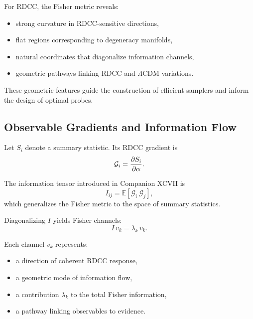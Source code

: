 \documentclass[11pt,a4paper]{article}
\begin{document}
For RDCC, the Fisher metric reveals:

\begin{itemize}
    \item strong curvature in RDCC-sensitive directions,
    \item flat regions corresponding to degeneracy manifolds,
    \item natural coordinates that diagonalize information channels,
    \item geometric pathways linking RDCC and $\Lambda$CDM variations.
\end{itemize}

These geometric features guide the construction of efficient samplers and inform
the design of optimal probes.

\subsection{Observable Gradients and Information Flow}

Let $S_{i}$ denote a summary statistic. Its RDCC gradient is
\begin{equation}
    \mathcal{G}_{i}
    =
    \pdv{S_{i}}{\alpha}.
\end{equation}

The information tensor introduced in Companion XCVII is
\begin{equation}
    I_{ij}
    =
    \mathbb{E}\!\left[
        \mathcal{G}_{i}\,
        \mathcal{G}_{j}
    \right],
\end{equation}
which generalizes the Fisher metric to the space of summary statistics.

Diagonalizing $I$ yields Fisher channels:
\begin{equation}
    I\,v_{k}
    =
    \lambda_{k}\,v_{k}.
\end{equation}

Each channel $v_{k}$ represents:

\begin{itemize}
    \item a direction of coherent RDCC response,
    \item a geometric mode of information flow,
    \item a contribution $\lambda_{k}$ to the total Fisher information,
    \item a pathway linking observables to evidence.
\end{itemize}
\end{document}
